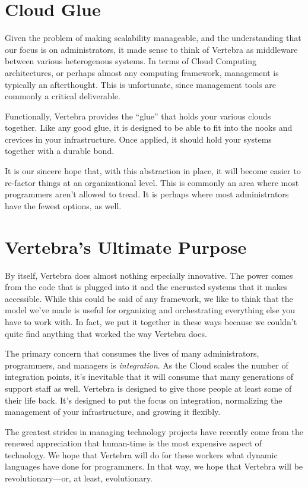 \section*{Cloud Glue}

Given the problem of making scalability manageable, and the understanding that our focus is on administrators, it made sense to think of Vertebra as middleware between various heterogenous systems.  In terms of Cloud Computing architectures, or perhaps almost any computing framework, management is typically an afterthought.  This is unfortunate, since management tools are commonly a critical deliverable.

Functionally, Vertebra provides the ``glue'' that holds your various clouds together.  Like any good glue, it is designed to be able to fit into the nooks and crevices in your infrastructure.  Once applied, it should hold your systems together with a durable bond.

It is our sincere hope that, with this abstraction in place, it will become easier to re-factor things at an organizational level.  This is commonly an area where most programmers aren't allowed to tread.  It is perhaps where most administrators have the fewest options, as well.

\section*{Vertebra's Ultimate Purpose}

By itself, Vertebra does almost nothing especially innovative.  The power comes from the code that is plugged into it and the encrusted systems that it makes accessible.  While this could be said of any framework, we like to think that the model we've made is useful for organizing and orchestrating everything else you have to work with.  In fact, we put it together in these ways because we couldn't quite find anything that worked the way Vertebra does.

The primary concern that consumes the lives of many administrators, programmers, and managers is \emph{integration}.  As the Cloud scales the number of integration points, it's inevitable that it will consume that many generations of support staff as well.  Vertebra is designed to give those people at least some of their life back.  It's designed to put the focus on integration, normalizing the management of your infrastructure, and growing it flexibly.

The greatest strides in managing technology projects have recently come from the renewed appreciation that human-time is the most expensive aspect of technology.  We hope that Vertebra will do for these workers what dynamic languages have done for programmers.  In that way, we hope that Vertebra will be revolutionary---or, at least, evolutionary.

